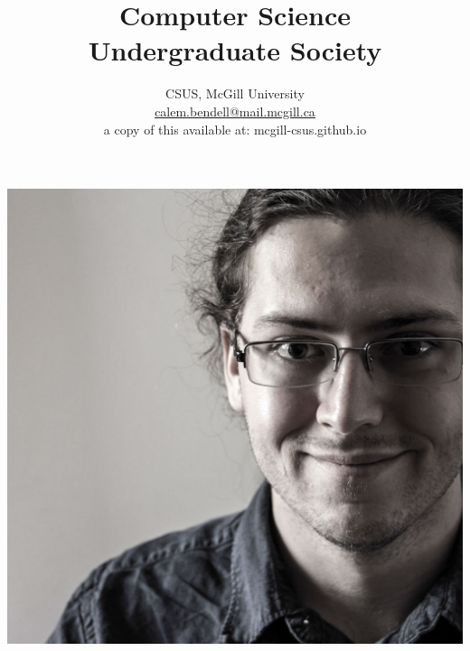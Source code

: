 

\title{Computer Science \\ Undergraduate Society \vspace*{1em}}
\author{
\large
CSUS, McGill University \\
\normalsize \href{mailto:calem.bendell@mail.mcgill.ca}{calem.bendell@mail.mcgill.ca} \\
a copy of this available at: mcgill-csus.github.io
}
\date{}



\maketitle

\clearpage

	\begin{center}
	\includegraphics[width=.35\textheight]{gfx/calbenthumbsmall.jpg}

\end{center}
